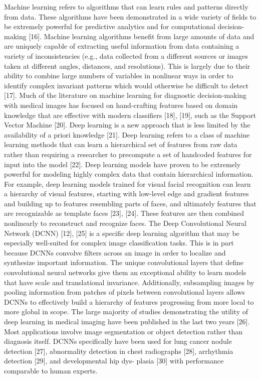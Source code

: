 Machine learning refers to algorithms that can learn rules and patterns directly from data. These algorithms have been demonstrated in a wide variety of fields to be extremely powerful for predictive analytics and for computational decision-making [16]. Machine learning algorithms benefit from large amounts of data and are uniquely capable of extracting useful information from data containing a variety of inconsistencies (e.g., data collected from a different sources or images taken at different angles, distances, and resolutions). This is largely due to their ability to combine large numbers of variables in nonlinear ways in order to identify complex invariant patterns which would otherwise be difficult to detect [17]. 
Much of the literature on machine learning for diagnostic decision-making with medical images has focused on hand-crafting features based on domain knowledge that are effective with modern classifiers [18], [19], such as the Support Vector Machine [20]. Deep learning is a new approach that is less limited by the availability of a priori knowledge [21]. 
Deep learning refers to a class of machine learning methods that can learn a hierarchical set of features from raw data rather than requiring a researcher to precompute a set of handcoded features for input into the model [22]. Deep learning models have proven to be extremely powerful for modeling highly complex data that contain hierarchical information. For example, deep learning models trained for visual facial recognition can learn a hierarchy of visual features, starting with low-level edge and gradient features and building up to features resembling parts of faces, and ultimately features that are recognizable as template faces [23], [24]. These features are then combined nonlinearly to reconstruct and recognize faces. 
The Deep Convolutional Neural Network (DCNN) [12], [25] is a specific deep learning algorithm that may be especially well-suited for complex image classification tasks. This is in part because DCNNs convolve filters across an image in order to localize and synthesize important information. The unique convolutional layers that define convolutional neural networks give them an exceptional ability to learn models that have scale and translational invariance. Additionally, subsampling images by pooling information from patches of pixels between convolutional layers allows DCNNs to effectively build a hierarchy of features progressing from more local to more global in scope. 
The large majority of studies demonstrating the utility of deep learning in medical imaging have been published in the last two years [26]. Most applications involve image segmentation or object detection rather than diagnosis itself. DCNNs specifically have been used for lung cancer nodule detection [27], abnormality detection in chest radiographs [28], arrhythmia detection [29], and developmental hip dys- plasia [30] with performance comparable to human experts. 


